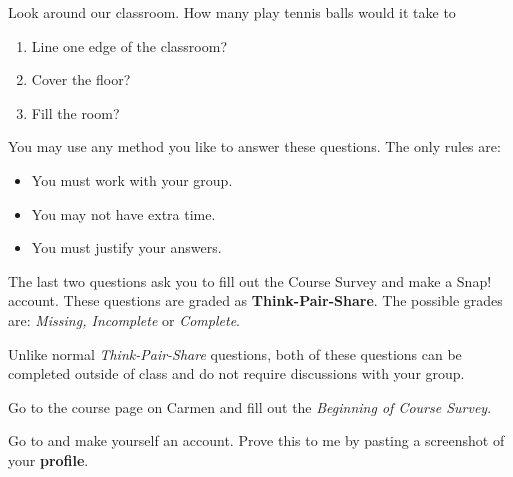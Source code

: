 \documentclass[handout,numbers,nooutcomes,hints]{../ximera}
\begin{document}
\begin{question}
Look around our classroom. How many play tennis balls would it take to
\begin{enumerate}
\item Line one edge of the classroom?
 \item Cover the floor?
 \item Fill the room?
\end{enumerate}

You may use any method you like to answer these questions. The only rules are:
\begin{itemize}
 \item You must work with your group.
 \item You may not have extra time.
 \item You must justify your answers.
\end{itemize}

\end{question}
\vspace{5 cm}

The last two questions ask you to fill out the Course Survey and make a Snap! account. These questions are graded as \textbf{Think-Pair-Share}. 
The possible grades are: \emph{Missing, Incomplete} or \emph{Complete}. 

Unlike normal \emph{Think-Pair-Share} questions, both of these questions can be completed outside of class and do not require discussions with your group.

\begin{question}

Go to the course page on Carmen and fill out the \emph{Beginning of Course Survey}.
\end{question}

\begin{question}
  Go to \flavor and make yourself an account. Prove this to me by
  pasting a screenshot of your \textbf{profile}.


 
\end{question}
\end{document}
